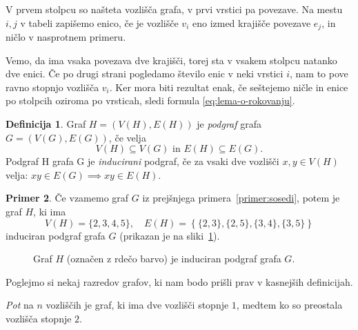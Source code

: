 \documentclass[12pt,a4paper]{amsart}
\theoremstyle{definition} %
\newtheorem{definicija}{Definicija}[section]
\newtheorem{primer}[definicija]{Primer}
\theoremstyle{plain} %
\newcommand{\graf}[1][G]{\ensuremath{#1 = (V(#1), E(#1))}}
\newcommand{\vozlisca}[1][G]{\ensuremath{V(#1)}}
\newcommand{\povezave}[1][G]{\ensuremath{E(#1)}}
\begin{document}
    V prvem stolpcu so našteta vozlišča grafa, v prvi vrstici pa povezave. Na mestu $i,j$ v tabeli zapišemo enico, če je vozlišče $v_i$ eno izmed krajišče povezave $e_j$, in ničlo v nasprotnem primeru. 
    
    Vemo, da ima vsaka povezava dve krajišči, torej sta v vsakem stolpcu natanko dve enici. Če po drugi strani pogledamo število enic v neki vrstici $i$, nam to pove ravno stopnjo vozlišča $v_i$. Ker mora biti rezultat enak, če seštejemo ničle in enice po stolpcih oziroma po vrsticah, sledi formula \eqref{eq:lema-o-rokovanju}.
\endproof

\begin{definicija}
	Graf $\graf[H]$ je \emph{podgraf} grafa $\graf$, če velja 
	\[ \vozlisca[H] \subseteq \vozlisca \text{ in } \povezave[H] \subseteq \povezave. \]
	Podgraf H grafa G je \emph{inducirani} podgraf, če za vsaki dve vozlišči $x,y\in \vozlisca[H]$ velja: $xy \in \povezave \implies xy \in \povezave[H]$.
\end{definicija}

\begin{primer}
    Če vzamemo graf $G$ iz prejšnjega primera~\ref{primer:sosedi}, potem je graf $H$, ki ima
    \[ \vozlisca[H] = \{2,3,4,5\},\quad \povezave[H] = \left\{ \{2,3\},\{2,5\},\{3,4\},\{3,5\} \right\} \]
    induciran podgraf grafa $G$ (prikazan je na sliki~\ref{fig:primer-podgrafa}).
\end{primer}
\medskip

\begin{figure}[h]
    \caption{Graf $H$ (označen z rdečo barvo) je induciran podgraf grafa $G$.}
    \label{fig:primer-podgrafa}
\end{figure}

Poglejmo si nekaj razredov grafov, ki nam bodo prišli prav v kasnejših definicijah. 

\emph{Pot} na $n$ vozliščih je graf, ki ima dve vozlišči stopnje $1$, medtem ko so preostala vozlišča stopnje $2$.
\end{document}
